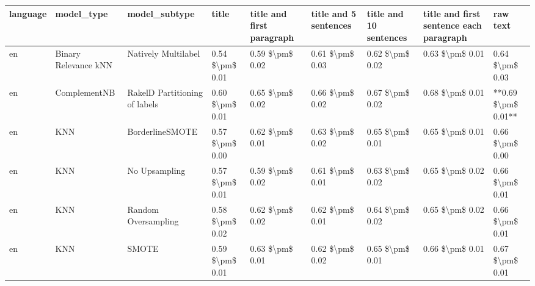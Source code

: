 \begin{tabular}{lllllllll}
\toprule
language &                      model\_type &                 model\_subtype &           title & title and first paragraph & title and 5 sentences & title and 10 sentences & title and first sentence each paragraph &            raw text \\
\midrule
      en &            Binary Relevance kNN &           Natively Multilabel & 0.54 \$\textbackslash pm\$ 0.01 &           0.59 \$\textbackslash pm\$ 0.02 &       0.61 \$\textbackslash pm\$ 0.03 &        0.62 \$\textbackslash pm\$ 0.02 &                         0.63 \$\textbackslash pm\$ 0.01 &     0.64 \$\textbackslash pm\$ 0.03 \\
      en &                    ComplementNB & RakelD Partitioning of labels & 0.60 \$\textbackslash pm\$ 0.01 &           0.65 \$\textbackslash pm\$ 0.02 &       0.66 \$\textbackslash pm\$ 0.02 &        0.67 \$\textbackslash pm\$ 0.02 &                         0.68 \$\textbackslash pm\$ 0.01 & **0.69 \$\textbackslash pm\$ 0.01** \\
      en &                             KNN &               BorderlineSMOTE & 0.57 \$\textbackslash pm\$ 0.00 &           0.62 \$\textbackslash pm\$ 0.01 &       0.63 \$\textbackslash pm\$ 0.02 &        0.65 \$\textbackslash pm\$ 0.01 &                         0.65 \$\textbackslash pm\$ 0.01 &     0.66 \$\textbackslash pm\$ 0.00 \\
      en &                             KNN &                 No Upsampling & 0.57 \$\textbackslash pm\$ 0.01 &           0.59 \$\textbackslash pm\$ 0.02 &       0.61 \$\textbackslash pm\$ 0.01 &        0.63 \$\textbackslash pm\$ 0.02 &                         0.65 \$\textbackslash pm\$ 0.02 &     0.66 \$\textbackslash pm\$ 0.01 \\
      en &                             KNN &           Random Oversampling & 0.58 \$\textbackslash pm\$ 0.02 &           0.62 \$\textbackslash pm\$ 0.02 &       0.62 \$\textbackslash pm\$ 0.01 &        0.64 \$\textbackslash pm\$ 0.02 &                         0.65 \$\textbackslash pm\$ 0.02 &     0.66 \$\textbackslash pm\$ 0.01 \\
      en &                             KNN &                         SMOTE & 0.59 \$\textbackslash pm\$ 0.01 &           0.63 \$\textbackslash pm\$ 0.01 &       0.62 \$\textbackslash pm\$ 0.02 &        0.65 \$\textbackslash pm\$ 0.01 &                         0.66 \$\textbackslash pm\$ 0.01 &     0.67 \$\textbackslash pm\$ 0.01 \\

\end{tabular}
